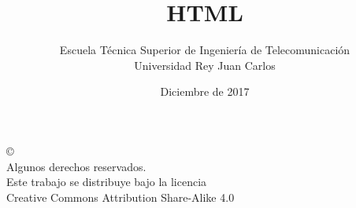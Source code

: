\documentclass[ucs]{beamer}
\begin{document}
\title[HTML]{HTML }
\author[GSyC]{Escuela Técnica Superior de Ingeniería de Telecomunicación\\
Universidad Rey Juan Carlos}
\date[2017]{Diciembre de 2017}


\begin{frame}
  \titlepage
\end{frame}



\begin{frame}[b]
\begin{flushright}
{\tiny
\copyright \insertshortdate~\insertshortauthor \\
  Algunos derechos reservados. \\
  Este trabajo se distribuye bajo la licencia \\
  Creative Commons Attribution Share-Alike 4.0\\
}
\end{flushright}  
\end{frame}







\end{document}
